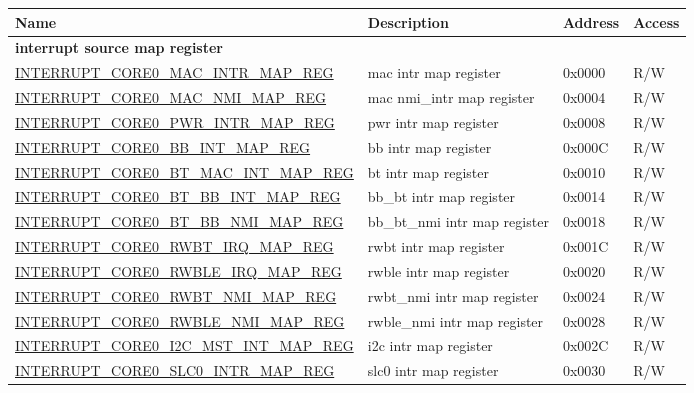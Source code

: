 \begin{longtable}{ | p{6cm} | p{7.2cm} | p{1.3cm} | p{1cm} | }
\hline\rowcolor{lightgray}
Name & Description &  Address & Access \\ \hline
\endhead
\multicolumn{4}{|l|}{\textbf{interrupt source map register}} \\ \hline
\hyperref[regdesc:INTERRUPTCORE0MACINTRMAPREG]{INTERRUPT\_CORE0\_MAC\_INTR\_MAP\_REG} & mac intr map register & 0x0000 & R/W \\ \hline
\hyperref[regdesc:INTERRUPTCORE0MACNMIMAPREG]{INTERRUPT\_CORE0\_MAC\_NMI\_MAP\_REG} & mac nmi\_intr map register & 0x0004 & R/W \\ \hline
\hyperref[regdesc:INTERRUPTCORE0PWRINTRMAPREG]{INTERRUPT\_CORE0\_PWR\_INTR\_MAP\_REG} & pwr intr map register & 0x0008 & R/W \\ \hline
\hyperref[regdesc:INTERRUPTCORE0BBINTMAPREG]{INTERRUPT\_CORE0\_BB\_INT\_MAP\_REG} & bb intr map register & 0x000C & R/W \\ \hline
\hyperref[regdesc:INTERRUPTCORE0BTMACINTMAPREG]{INTERRUPT\_CORE0\_BT\_MAC\_INT\_MAP\_REG} & bt intr map register & 0x0010 & R/W \\ \hline
\hyperref[regdesc:INTERRUPTCORE0BTBBINTMAPREG]{INTERRUPT\_CORE0\_BT\_BB\_INT\_MAP\_REG} & bb\_bt intr map register & 0x0014 & R/W \\ \hline
\hyperref[regdesc:INTERRUPTCORE0BTBBNMIMAPREG]{INTERRUPT\_CORE0\_BT\_BB\_NMI\_MAP\_REG} & bb\_bt\_nmi intr map register & 0x0018 & R/W \\ \hline
\hyperref[regdesc:INTERRUPTCORE0RWBTIRQMAPREG]{INTERRUPT\_CORE0\_RWBT\_IRQ\_MAP\_REG} & rwbt intr map register & 0x001C & R/W \\ \hline
\hyperref[regdesc:INTERRUPTCORE0RWBLEIRQMAPREG]{INTERRUPT\_CORE0\_RWBLE\_IRQ\_MAP\_REG} & rwble intr map register & 0x0020 & R/W \\ \hline
\hyperref[regdesc:INTERRUPTCORE0RWBTNMIMAPREG]{INTERRUPT\_CORE0\_RWBT\_NMI\_MAP\_REG} & rwbt\_nmi intr map register & 0x0024 & R/W \\ \hline
\hyperref[regdesc:INTERRUPTCORE0RWBLENMIMAPREG]{INTERRUPT\_CORE0\_RWBLE\_NMI\_MAP\_REG} & rwble\_nmi intr map register & 0x0028 & R/W \\ \hline
\hyperref[regdesc:INTERRUPTCORE0I2CMSTINTMAPREG]{INTERRUPT\_CORE0\_I2C\_MST\_INT\_MAP\_REG} & i2c intr map register & 0x002C & R/W \\ \hline
\hyperref[regdesc:INTERRUPTCORE0SLC0INTRMAPREG]{INTERRUPT\_CORE0\_SLC0\_INTR\_MAP\_REG} & slc0 intr map register & 0x0030 & R/W \\ \hline

\end{longtable}
